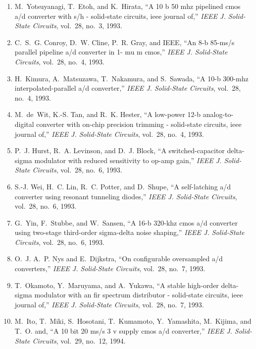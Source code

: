 \begin{enumerate}
\item
M.~Yotsuyanagi, T.~Etoh, and K.~Hirata, ``A 10 b 50 mhz pipelined cmos a/d
  converter with s/h - solid-state circuits, ieee journal of,'' \emph{{IEEE} J.
  Solid-State Circuits}, vol.~28, no.~3, 1993.

\item
C.~S.~G. Conroy, D.~W. Cline, P.~R. Gray, and IEEE, ``An 8-b 85-ms/s parallel
  pipeline a/d converter in 1- mu m cmos,'' \emph{{IEEE} J. Solid-State
  Circuits}, vol.~28, no.~4, 1993.

\item
H.~Kimura, A.~Matsuzawa, T.~Nakamura, and S.~Sawada, ``A 10-b 300-mhz
  interpolated-parallel a/d converter,'' \emph{{IEEE} J. Solid-State Circuits},
  vol.~28, no.~4, 1993.

\item
M.~de~Wit, K.-S. Tan, and R.~K. Hester, ``A low-power 12-b analog-to-digital
  converter with on-chip precision trimming - solid-state circuits, ieee
  journal of,'' \emph{{IEEE} J. Solid-State Circuits}, vol.~28, no.~4, 1993.

\item
P.~J. Hurst, R.~A. Levinson, and D.~J. Block, ``A switched-capacitor
  delta-sigma modulator with reduced sensitivity to op-amp gain,'' \emph{{IEEE}
  J. Solid-State Circuits}, vol.~28, no.~6, 1993.

\item
S.-J. Wei, H.~C. Lin, R.~C. Potter, and D.~Shupe, ``A self-latching a/d
  converter using resonant tunneling diodes,'' \emph{{IEEE} J. Solid-State
  Circuits}, vol.~28, no.~6, 1993.

\item
G.~Yin, F.~Stubbe, and W.~Sansen, ``A 16-b 320-khz cmos a/d converter using
  two-stage third-order sigma-delta noise shaping,'' \emph{{IEEE} J.
  Solid-State Circuits}, vol.~28, no.~6, 1993.

\item
O.~J. A.~P. Nys and E.~Dijkstra, ``On configurable oversampled a/d
  converters,'' \emph{{IEEE} J. Solid-State Circuits}, vol.~28, no.~7, 1993.

\item
T.~Okamoto, Y.~Maruyama, and A.~Yukawa, ``A stable high-order delta-sigma
  modulator with an fir spectrum distributor - solid-state circuits, ieee
  journal of,'' \emph{{IEEE} J. Solid-State Circuits}, vol.~28, no.~7, 1993.

\item
M.~Ito, T.~Miki, S.~Hosotani, T.~Kumamoto, Y.~Yamashita, M.~Kijima, and T.~O.
  and, ``A 10 bit 20 ms/s 3 v supply cmos a/d converter,'' \emph{{IEEE} J.
  Solid-State Circuits}, vol.~29, no.~12, 1994.


\end{enumerate}
